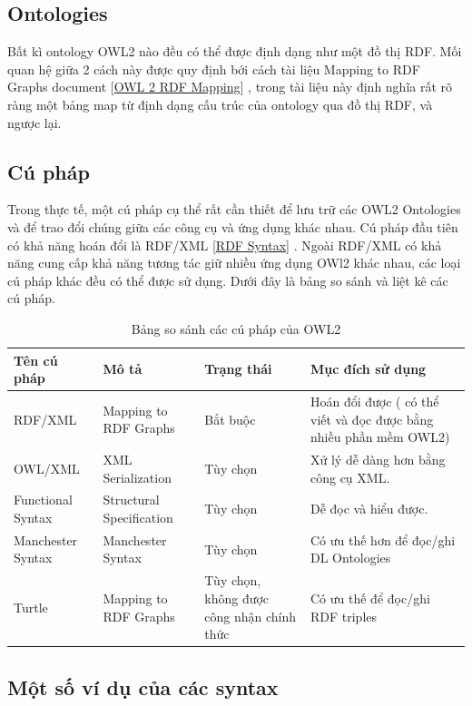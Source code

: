 \subsection{Ontologies}
Bất kì ontology OWL2 nào đều có thể được định dạng như một đồ thị RDF. Mối quan hệ giữa 2 cách này được quy định bới cách tài liệu Mapping to RDF Graphs document [\href{http://www.w3.org/TR/owl2-overview/#ref-owl-2-rdf-mapping}{OWL 2 RDF Mapping}] \cite{mapping_rdf_graph}, trong tài liệu này định nghĩa rất rõ ràng một bảng map từ định dạng cấu trúc của ontology qua đồ thị RDF, và ngược lại. 
\subsection{Cú pháp}
Trong thực tế, một cú pháp cụ thể rất cần thiết để lưu trữ các OWL2 Ontologies và để trao đổi chúng giữa các công cụ và ứng dụng khác nhau. Cú pháp đầu tiên có khả năng hoán đổi là RDF/XML [\href{http://www.w3.org/TR/owl2-overview/#ref-rdf-syntax}{RDF Syntax}] \cite{rdfxml}. Ngoài RDF/XML có khả năng cung cấp khả năng tương tác giữ nhiều ứng dụng OWl2 khác nhau, các loại cú pháp khác đều có thể được sử dụng. Dưới đây là bảng so sánh và liệt kê các cú pháp.
\begin{table}[ht!]
\begin{tabular}{ |p{3cm}|p{4cm}|p{3cm}|p{4cm}|}
\hline
Tên cú pháp & Mô tả & Trạng thái & Mục đích sử dụng\\
\hline
RDF/XML & Mapping to RDF Graphs \cite{mapping_rdf_graph} \cite{rdfxml} & Bắt buộc & Hoán đổi được ( có thể viết và đọc được bằng nhiều phần mềm OWL2)
\\
\hline
OWL/XML & XML Serialization \cite{owlxml} & Tùy chọn & Xử lý dễ dàng hơn bằng công cụ XML.
\\
\hline
Functional Syntax & Structural Specification \cite{func_syntax} & Tùy chọn & Dễ đọc và hiểu được.
\\
\hline
Manchester Syntax & Manchester Syntax \cite{man_syntax} & Tùy chọn & Có ưu thế hơn để đọc/ghi DL Ontologies
\\
\hline
Turtle & Mapping to RDF Graphs \cite{mapping_rdf_graph} & Tùy chọn, không được công nhận chính thức & Có ưu thế để đọc/ghi RDF triples
\\
\hline
\end{tabular}
\caption{Bảng so sánh các cú pháp của OWL2\label{overflow}}
\end{table}
\subsection{Một số ví dụ của các syntax}
